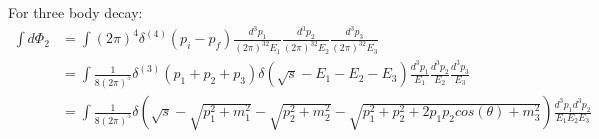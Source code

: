 \documentclass{article}
\begin{document}
\begin{CJK*}{GBK}{song}
For three body decay:
\begin{equation}
\begin{aligned}
\int d\Phi_2&=\int(2\pi)^4\delta^{(4)}(p_i-p_f)\frac{d^3p_1}{(2\pi)^32E_1}\frac{d^3p_2}{(2\pi)^32E_2}\frac{d^3p_3}{(2\pi)^32E_3}\\
&=\int\frac{1}{8(2\pi)^5}\delta^{(3)}(p_1+p_2+p_3)\delta(\sqrt{s}-E_1-E_2-E_3)\frac{d^3p_1}{E_1}\frac{d^3p_2}{E_2}\frac{d^3p_3}{E_3}\\
&=\int\frac{1}{8(2\pi)^5}\delta(\sqrt{s}-\sqrt{p_1^2+m_1^2}-\sqrt{p_2^2+m_2^2}-\sqrt{p_1^2+p_2^2+2p_1p_2cos(\theta)+m_3^2})\frac{d^3p_1d^3p_2}{E_1E_2E_3}
\end{aligned}
\end{equation}




















\end{CJK*}
\end{document}
